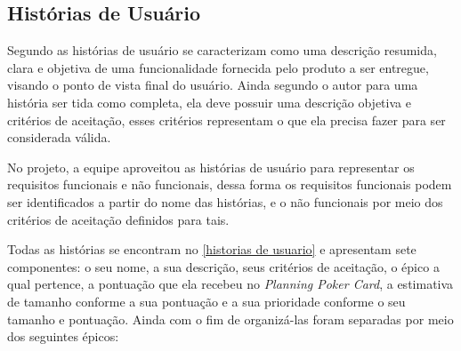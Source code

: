 

\subsection{Histórias de Usuário}
Segundo  as histórias de usuário se caracterizam como uma descrição resumida, clara e objetiva de uma funcionalidade fornecida pelo produto a ser entregue, visando o ponto de vista final do usuário. Ainda segundo o autor para uma história ser tida como completa, ela deve possuir uma descrição objetiva e critérios de aceitação, esses critérios representam o que ela precisa fazer para ser considerada válida.

No projeto, a equipe aproveitou as histórias de usuário para representar os requisitos funcionais e não funcionais, dessa forma os requisitos funcionais podem ser identificados a partir do nome das histórias, e o não funcionais por meio dos critérios de aceitação definidos para tais.

Todas as histórias se encontram no \autoref{historias de usuario} e apresentam sete componentes: o seu nome, a sua descrição, seus critérios de aceitação, o épico a qual pertence, a pontuação que ela recebeu no \textsl{Planning Poker Card}, a estimativa de tamanho conforme a sua pontuação e a sua prioridade conforme o seu tamanho e pontuação. Ainda com o fim de organizá-las foram separadas por meio dos seguintes épicos:

